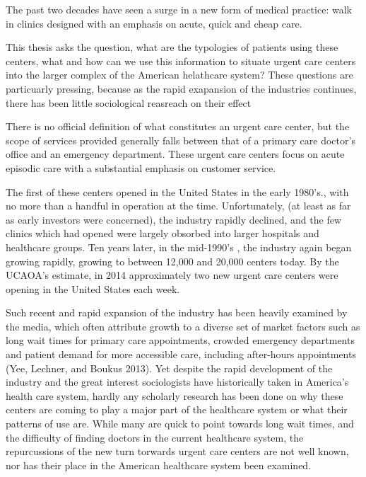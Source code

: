 \documentclass[12pt,twoside]{reedthesis}
\begin{document}
  The past two decades have seen a surge in a new form of medical
  practice: walk in clinics designed with an emphasis on acute, quick and
  cheap care.
  
  This thesis asks the question, what are the typologies of patients using
  these centers, what and how can we use this information to situate
  urgent care centers into the larger complex of the American helathcare
  system? These questions are particuarly pressing, because as the rapid
  exapansion of the industries continues, there has been little
  sociological reasreach on their effect
  
  There is no official definition of what constitutes an urgent care
  center, but the scope of services provided generally falls between that
  of a primary care doctor's office and an emergency department. These
  urgent care centers focus on acute episodic care with a substantial
  emphasis on customer service.
  
  The first of these centers opened in the United States in the early
  1980's., with no more than a handful in operation at the time.
  Unfortunately, (at least as far as early investors were concerned), the
  industry rapidly declined, and the few clinics which had opened were
  largely obsorbed into larger hospitals and healthcare groups. Ten years
  later, in the mid-1990's , the industry again began growing rapidly,
  growing to between 12,000 and 20,000 centers today. By the UCAOA's
  estimate, in 2014 approximately two new urgent care centers were opening
  in the United States each week.
  
  Such recent and rapid expansion of the industry has been heavily
  examined by the media, which often attribute growth to a diverse set of
  market factors such as long wait times for primary care appointments,
  crowded emergency departments and patient demand for more accessible
  care, including after-hours appointments (Yee, Lechner, and Boukus
  2013). Yet despite the rapid development of the industry and the great
  interest sociologists have historically taken in America's health care
  system, hardly any scholarly research has been done on why these centers
  are coming to play a major part of the healthcare system or what their
  patterns of use are. While many are quick to point towards long wait
  times, and the difficulty of finding doctors in the current healthcare
  system, the repurcussions of the new turn torwards urgent care centers
  are not well known, nor has their place in the American healthcare
  system been examined.
  
\end{document}
